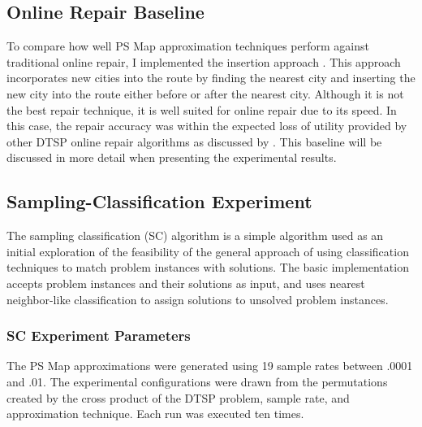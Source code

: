 \subsection{Online Repair Baseline} To compare how well PS Map approximation techniques perform against traditional online repair, I implemented the insertion approach \citep{psaraftis88dynamic}.  This approach incorporates new cities into the route by finding the nearest city and inserting the new city into the route either before or after the nearest city.  Although it is not the best repair technique, it is well suited for online repair due to its speed.  In this case, the repair accuracy was within the expected loss of utility provided by other  DTSP online repair algorithms as discussed by \citeauthor{larsen2000dvrp}.  This baseline will be discussed in more detail when presenting the experimental results.

\subsection{Sampling-Classification Experiment}

The sampling classification (SC) algorithm is a simple algorithm used as an initial exploration of the feasibility of the general approach of using classification techniques to match problem instances with solutions.  The basic implementation accepts problem instances and their solutions as input, and uses nearest neighbor-like classification to assign solutions to unsolved problem instances.


\subsubsection{SC Experiment Parameters} The PS Map approximations were generated using 19 sample rates between .0001 and .01.  The experimental configurations were drawn from the permutations created by the cross product of the DTSP problem, sample rate, and approximation technique.  Each run was executed ten times.


